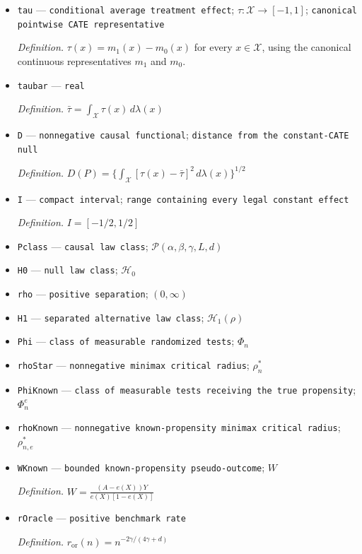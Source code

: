 \documentclass{article}
\begin{document}
\begin{itemize}
  \item \texttt{tau} --- \texttt{conditional average treatment effect}; \(\tau:\mathcal X\to[-1,1]\); \texttt{canonical pointwise CATE representative}
  \par\smallskip\noindent\emph{Definition.} \(\tau(x)=m_1(x)-m_0(x)\) for every \(x\in\mathcal X\), using the canonical continuous representatives \(m_1\) and \(m_0\).
  \item \texttt{taubar} --- \texttt{real}
  \par\smallskip\noindent\emph{Definition.} \(\bar\tau=\int_{\mathcal X}\tau(x)\,d\lambda(x)\)
  \item \texttt{D} --- \texttt{nonnegative causal functional}; \texttt{distance from the constant-\allowbreak{}CATE null}
  \par\smallskip\noindent\emph{Definition.} \(D(P)=\{\int_{\mathcal X}[\tau(x)-\bar\tau]^2\,d\lambda(x)\}^{1/2}\)
  \item \texttt{I} --- \texttt{compact interval}; \texttt{range containing every legal constant effect}
  \par\smallskip\noindent\emph{Definition.} \(I=[-1/2,1/2]\)
  \item \texttt{Pclass} --- \texttt{causal law class}; \(\mathcal P(\alpha,\beta,\gamma,L,d)\)
  \item \texttt{H0} --- \texttt{null law class}; \(\mathcal H_0\)
  \item \texttt{rho} --- \texttt{positive separation}; \((0,\infty)\)
  \item \texttt{H1} --- \texttt{separated alternative law class}; \(\mathcal H_1(\rho)\)
  \item \texttt{Phi} --- \texttt{class of measurable randomized tests}; \(\Phi_n\)
  \item \texttt{rhoStar} --- \texttt{nonnegative minimax critical radius}; \(\rho_n^*\)
  \item \texttt{PhiKnown} --- \texttt{class of measurable tests receiving the true propensity}; \(\Phi_n^{e}\)
  \item \texttt{rhoKnown} --- \texttt{nonnegative known-\allowbreak{}propensity minimax critical radius}; \(\rho_{n,e}^*\)
  \item \texttt{WKnown} --- \texttt{bounded known-\allowbreak{}propensity pseudo-\allowbreak{}outcome}; \(W\)
  \par\smallskip\noindent\emph{Definition.} \(W=\frac{(A-e(X))Y}{e(X)[1-e(X)]}\)
  \item \texttt{rOracle} --- \texttt{positive benchmark rate}
  \par\smallskip\noindent\emph{Definition.} \(r_{\mathrm{or}}(n)=n^{-2\gamma/(4\gamma+d)}\)

\end{itemize}
\end{document}
